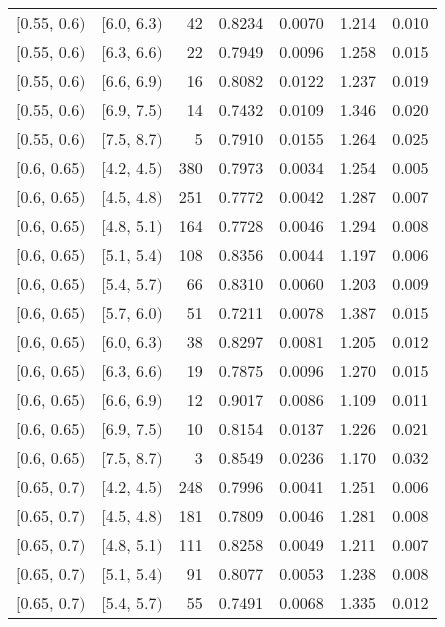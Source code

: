 \begin{longtable}{| l | l | r | r | r | r | r |}
        $[$0.55, 0.6$)$ & $[$6.0, 6.3$)$ & 42  & 0.8234 & 0.0070 & 1.214 & 0.010 \\
        $[$0.55, 0.6$)$ & $[$6.3, 6.6$)$ & 22  & 0.7949 & 0.0096 & 1.258 & 0.015 \\
        $[$0.55, 0.6$)$ & $[$6.6, 6.9$)$ & 16  & 0.8082 & 0.0122 & 1.237 & 0.019 \\
        $[$0.55, 0.6$)$ & $[$6.9, 7.5$)$ & 14  & 0.7432 & 0.0109 & 1.346 & 0.020 \\
        $[$0.55, 0.6$)$ & $[$7.5, 8.7$)$ & 5   & 0.7910 & 0.0155 & 1.264 & 0.025 \\
        $[$0.6, 0.65$)$ & $[$4.2, 4.5$)$ & 380 & 0.7973 & 0.0034 & 1.254 & 0.005 \\
        $[$0.6, 0.65$)$ & $[$4.5, 4.8$)$ & 251 & 0.7772 & 0.0042 & 1.287 & 0.007 \\
        $[$0.6, 0.65$)$ & $[$4.8, 5.1$)$ & 164 & 0.7728 & 0.0046 & 1.294 & 0.008 \\
        $[$0.6, 0.65$)$ & $[$5.1, 5.4$)$ & 108 & 0.8356 & 0.0044 & 1.197 & 0.006 \\
        $[$0.6, 0.65$)$ & $[$5.4, 5.7$)$ & 66  & 0.8310 & 0.0060 & 1.203 & 0.009 \\
        $[$0.6, 0.65$)$ & $[$5.7, 6.0$)$ & 51  & 0.7211 & 0.0078 & 1.387 & 0.015 \\
        $[$0.6, 0.65$)$ & $[$6.0, 6.3$)$ & 38  & 0.8297 & 0.0081 & 1.205 & 0.012 \\
        $[$0.6, 0.65$)$ & $[$6.3, 6.6$)$ & 19  & 0.7875 & 0.0096 & 1.270 & 0.015 \\
        $[$0.6, 0.65$)$ & $[$6.6, 6.9$)$ & 12  & 0.9017 & 0.0086 & 1.109 & 0.011 \\
        $[$0.6, 0.65$)$ & $[$6.9, 7.5$)$ & 10  & 0.8154 & 0.0137 & 1.226 & 0.021 \\
        $[$0.6, 0.65$)$ & $[$7.5, 8.7$)$ & 3   & 0.8549 & 0.0236 & 1.170 & 0.032 \\
        $[$0.65, 0.7$)$ & $[$4.2, 4.5$)$ & 248 & 0.7996 & 0.0041 & 1.251 & 0.006 \\
        $[$0.65, 0.7$)$ & $[$4.5, 4.8$)$ & 181 & 0.7809 & 0.0046 & 1.281 & 0.008 \\
        $[$0.65, 0.7$)$ & $[$4.8, 5.1$)$ & 111 & 0.8258 & 0.0049 & 1.211 & 0.007 \\
        $[$0.65, 0.7$)$ & $[$5.1, 5.4$)$ & 91  & 0.8077 & 0.0053 & 1.238 & 0.008 \\
        $[$0.65, 0.7$)$ & $[$5.4, 5.7$)$ & 55  & 0.7491 & 0.0068 & 1.335 & 0.012 \\

\end{longtable}
